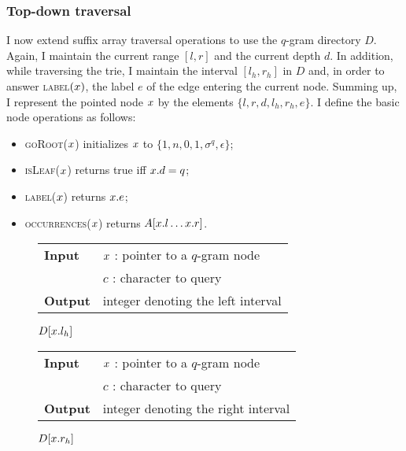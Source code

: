 \subsubsection{Top-down traversal}

I now extend suffix array traversal operations to use the $q$-gram directory $D$.
Again, I maintain the current range $[l,r]$ and the current depth $d$.
In addition, while traversing the trie, I maintain the interval $[l_h,r_h]$ in $D$ and, in order to answer \textsc{label}$(x)$, the label $e$ of the edge entering the current node.
Summing up, I represent the pointed node $x$ by the elements $\{ l, r, d, l_h, r_h, e \}$.
I define the basic node operations as follows:
\begin{itemize}
\item \textsc{goRoot}($x$) initializes $x$ to $\{ 1, n, 0, 1, \sigma^q, \epsilon \}$;
\item \textsc{isLeaf}($x$) returns true iff $x.d=q$;
\item \textsc{label}($x$) returns $x.e$;
\item \textsc{occurrences}($x$) returns $A[x.l \dots x.r]$.
\end{itemize}

\begin{figure*}[b]
\begin{minipage}[t]{.5\textwidth}
\begin{algorithm}[H]
\begin{tabular}{ll}
\textbf{Input}  & $x$ : pointer to a $q$-gram node\\
				& $c$ : character to query\\
\textbf{Output} & integer denoting the left interval\\
\end{tabular}
\begin{algorithmic}[1]
\State \Return $D[x.l_h]$
\end{algorithmic}
\label{alg:qgram-lower}
\end{algorithm}
\end{minipage}
\hfill
\begin{minipage}[t]{.5\textwidth}
\begin{algorithm}[H]
\begin{tabular}{ll}
\textbf{Input}  & $x$ : pointer to a $q$-gram node\\
				& $c$ : character to query\\
\textbf{Output} & integer denoting the right interval\\
\end{tabular}
\begin{algorithmic}[1]
\State \Return $D[x.r_h]$
\end{algorithmic}
\label{alg:qgram-upper}
\end{algorithm}
\end{minipage}
\end{figure*}


